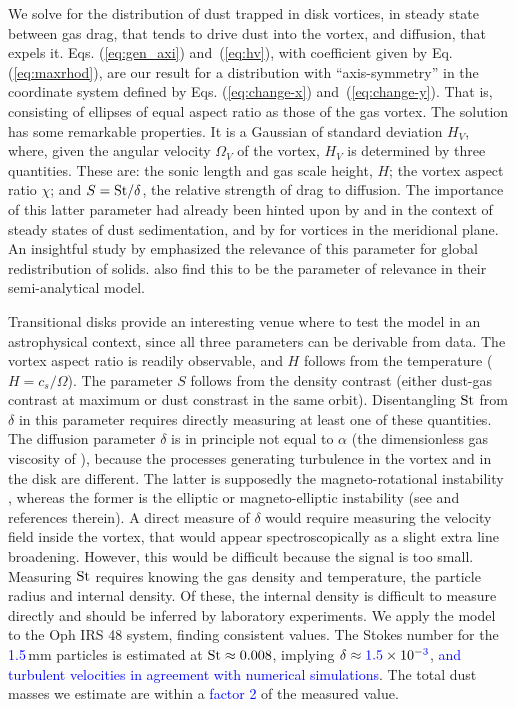 \documentclass[apj]{emulateapj}
\def\blue#1{\textcolor{blue}{ #1}}
\newcommand{\Eq}[1]{Eq. (\ref{#1})}
\newcommand{\Eqs}[2]{Eqs. (\ref{#1}) and~(\ref{#2})}
\newcommand{\eq}[1]{\Eq{#1}}
\newcommand{\eqs}[2]{\Eqs{#1}{#2}}
\newcommand{\St}{{\rm St}}
\begin{document}
We solve for the distribution of dust trapped in
disk vortices, in steady state between gas drag, that 
tends to drive dust into the vortex, and diffusion, that expels
it. \eqs{eq:gen_axi}{eq:hv}, with coefficient given by \eq{eq:maxrhod},
 are our result for a distribution with
``axis-symmetry''  in the coordinate system defined by
\eqs{eq:change-x}{eq:change-y}. That is, consisting of ellipses of
equal aspect ratio as those of the gas vortex. The solution has some remarkable
properties. It is a Gaussian of standard deviation $H_V$, where, given
the angular velocity $\varOmega_V$ of the vortex, $H_V$
is determined by three quantities. These are: 
the sonic length and gas scale height, $H$; the vortex aspect ratio
$\chi$; and $S=\St/\delta$, the relative strength of drag to
diffusion. The importance of this latter parameter had already been 
hinted upon by \citet{Cuzzi93} and \citet{Dubrulle95} 
in the context of steady states of dust sedimentation, and by
\citet{Klahr-Henning97} for vortices in the meridional plane. An insightful study by 
\citet{Jacquet12} emphasized the relevance of this parameter for 
global redistribution of solids. \citet{Birnstiel13} also find this to be 
the parameter of relevance in their semi-analytical model.

Transitional disks provide an interesting venue where to test the
model in an astrophysical context, since all three parameters can be
derivable from data. The vortex aspect ratio is readily observable,
and $H$ follows from the temperature ($H=c_s/\varOmega$). The 
parameter $S$ follows from the density contrast (either dust-gas
contrast at maximum or dust constrast in the same
orbit). Disentangling $\St$ from $\delta$ in this parameter requires
directly measuring at least one of these quantities. The diffusion
parameter $\delta$ is in principle not equal to
$\alpha$ (the dimensionless gas viscosity of
\citealt{Shakura-Sunyaev73}), because the processes generating turbulence in the
vortex and in the disk are different. The latter is supposedly the
magneto-rotational instability \citep[MRI,][]{Balbus-Hawley91}, whereas the former is the elliptic or
magneto-elliptic instability (see \citealt{Lyra13} and references
therein). A direct measure of $\delta$ would require measuring the
velocity field inside the vortex, that would appear spectroscopically 
as a slight extra line broadening. However, this would be
difficult because the signal is too small. Measuring $\St$ requires
knowing the gas density and temperature, the particle radius and
internal density. Of these, the internal density is difficult to measure
directly and should be inferred by laboratory experiments. We apply
the model to the Oph IRS 48 system, finding consistent values. The
Stokes number for the \blue{1.5}\,mm particles is estimated at
\blue{$\St \approx 0.008$}, implying 
$\delta \approx \blue{1.5}\times 10^{-\blue{3}}$, \blue{and turbulent velocities in 
agreement with numerical simulations}. The total dust masses we estimate 
are within a \blue{factor 2} of the measured value. 
\end{document}
